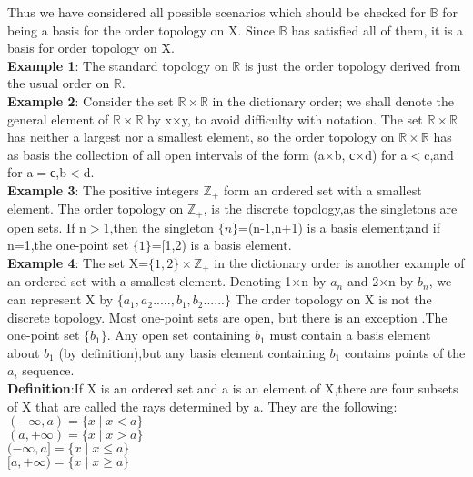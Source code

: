 \documentclass[a4paper,english,12pt]{article}
\begin{document}
\begin{flushleft}
Thus we have considered all possible scenarios which should be checked for $\mathbb{B}$ for being a basis for the order topology on X. Since $\mathbb{B}$ has satisfied all of them, it is a basis for order topology on X.\\
\vspace{1mm}
{\bf Example 1}: The standard topology on $\mathbb{R}$ is just the order topology derived from the usual order on $\mathbb{R}$.\\
\vspace{1mm}
{\bf Example 2}: Consider the set $\mathbb{R}\times\mathbb{R}$ in the dictionary order; we shall denote the general element of $\mathbb{R}\times\mathbb{R}$ by x$\times$y, to avoid difficulty with notation. The set $\mathbb{R}\times\mathbb{R}$ has neither a
largest nor a smallest element, so the order topology on $\mathbb{R}\times\mathbb{R}$ has as basis the collection of all open intervals of the form (a$\times$b, с$\times$d) for a$<$c,and for a$=$с,b$<$d.\\
{\bf Example 3}: The positive integers $\mathbb{Z}_+$ form an ordered set with a smallest element. The order topology on $\mathbb{Z}_+$, is the discrete topology,as the singletons are open sets. If n$>$1,then the singleton $\{n\}$=(n-1,n+1) is a basis element;and if n=1,the one-point set $\{1\}$=[1,2) is a basis element.\\
{\bf Example 4}: The set X=$\{1,2\}\times\mathbb{Z}_+$ in the dictionary order is another example of an ordered set with a smallest element. Denoting 1$\times$n by $a_n$ and 2$\times$n by $b_n$, we can represent X by $\{a_1,a_2.....,b_1,b_2......\}$
The order topology on X is not the discrete topology. Most one-point sets are open, but
there is an exception .The one-point set $\{b_1\}$. Any open set containing $b_1$ must contain a basis element about $b_1$ (by definition),but any basis element containing $b_1$ contains points of the $a_i$ sequence.\\
\vspace{2mm}
{\bf Definition}:If X is an ordered set and a is an element of X,there are four subsets of X that are called the rays determined by a. They are the following:\\
$(-\infty,a)=\{x\mid x<a\}$\\
$(a,+\infty)=\{x\mid x>a\}$\\
$(-\infty,a]=\{x\mid x\leq a\}$\\
$[a,+\infty)=\{x\mid x\geq a\}$\\


\end{flushleft}
\end{document}
